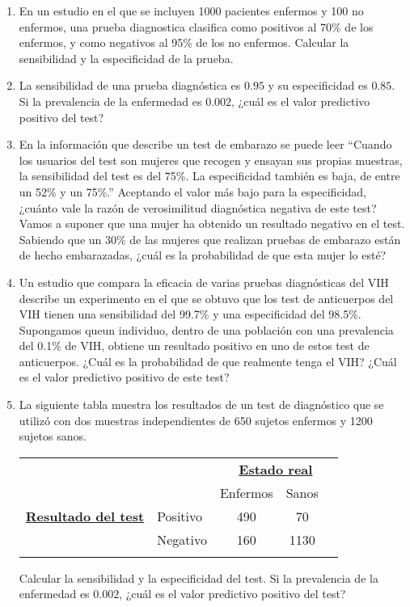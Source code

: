 \documentclass[10pt,a4paper]{article}
\begin{document}
\begin{enumerate}

    \item  En un estudio en el que se incluyen 1000 pacientes enfermos y 100 no enfermos, una prueba diagnostica clasifica como positivos al 70\% de los enfermos, y como negativos al 95\% de los no enfermos. Calcular la sensibilidad y la especificidad de la prueba.

    \item  La sensibilidad de una prueba diagnóstica es $0.95$ y su especificidad es $0.85$. Si la prevalencia de la enfermedad es $0.002$, ¿cuál es el valor predictivo positivo del test?

    \item En la información que describe un test de embarazo se puede leer ``Cuando los usuarios del test son mujeres que recogen y ensayan sus propias muestras, la sensibilidad del test es del 75\%. La especificidad también es baja, de entre un 52\% y un 75\%.'' Aceptando el valor más bajo para la especificidad, ¿cuánto vale la razón de verosimilitud diagnóstica negativa de este test? Vamos a suponer que una mujer ha obtenido un resultado negativo en el test. Sabiendo que un 30\% de las mujeres que realizan pruebas de embarazo están de hecho embarazadas, ¿cuál es la probabilidad de que esta mujer lo esté?

    \item Un estudio que compara la eficacia de varias pruebas diagnósticas del VIH describe un experimento en el que se obtuvo que los test de anticuerpos del VIH tienen una sensibilidad del 99.7\% y una especificidad del 98.5\%. Supongamos queun individuo, dentro de una población con una prevalencia del 0.1\%  de VIH, obtiene un resultado positivo en uno de estos test de anticuerpos. ¿Cuál es la probabilidad de que realmente tenga el VIH? ¿Cuál es el valor predictivo positivo de este test?

    \item La siguiente tabla muestra los resultados de un test de diagnóstico que se utilizó con dos muestras independientes de 650 sujetos enfermos y 1200 sujetos sanos.

        \begin{center}
            \begin{tabular}{llccc}
            &&\multicolumn{3}{c}{\underline{\bf Estado real}}\\

                                  &          & Enfermos & Sanos& \\
            \hline
  \underline{\bf Resultado del test}          & Positivo & 490 & 70   &   \\
                                              & Negativo & 160 & 1130 &   \\
            \hline
                                              &          &     &     &    \\
            \hline
            \end{tabular}
        \end{center}
        Calcular la sensibilidad y la especificidad del test. Si la prevalencia de la enfermedad es $0.002$, ¿cuál es el valor predictivo positivo del test?



\end{enumerate}
\end{document}
